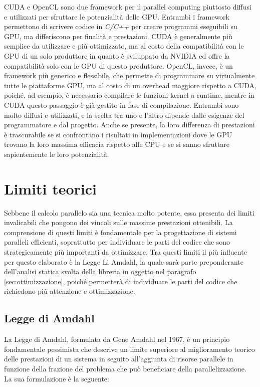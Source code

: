 CUDA e OpenCL sono due framework per il parallel computing piuttosto diffusi e utilizzati
per sfruttare le potenzialità delle GPU. Entrambi i framework permettono di
scrivere codice in \textit{C/C++} per creare programmi eseguibili su GPU, ma
differiscono per finalità e prestazioni. CUDA è generalmente più semplice da utilizzare
e più ottimizzato, ma al costo della compatibilità con le GPU di un solo
produttore in quanto è sviluppato da NVIDIA ed offre la compatibilità solo con
le GPU di questo produttore. OpenCL, invece, è un framework più generico e flessibile,
che permette di programmare su virtualmente tutte le piattaforme GPU, ma al costo
di un overhead maggiore rispetto a CUDA, poiché, ad esempio, è necessario
compilare le funzioni kernel a runtime, mentre in CUDA questo passaggio è già gestito
in fase di compilazione. Entrambi sono molto diffusi e utilizzati, e la scelta tra
uno e l'altro dipende dalle esigenze del programmatore e dal progetto. Anche se
presente, la loro differenza di prestazioni è trascurabile se si confrontano i risultati
in implementazioni dove le GPU trovano la loro massima efficacia rispetto alle CPU
e se si sanno sfruttare sapientemente le loro potenzialità.

\section{Limiti teorici}
\label{sec:limititeorici}

Sebbene il calcolo parallelo sia una tecnica molto potente, essa presenta dei limiti
invalicabili che pongono dei vincoli sulle massime prestazioni ottenibili. La
comprensione di questi limiti è fondamentale per la progettazione di sistemi
paralleli efficienti, soprattutto per individuare le parti del codice che sono strategicamente
più importanti da ottimizzare. Tra questi limiti il più influente per questo
elaborato è la Legge Li Amdahl, la quale sarà parte preponderante dell'analisi statica
svolta della libreria in oggetto nel paragrafo \ref{sec:ottimizzazione}, poiché
permetterà di individuare le parti del codice che richiedono più attenzione e
ottimizzazione.

\subsection{Legge di Amdahl}
\label{sec:amdahl}

La Legge di Amdahl, formulata da Gene Amdahl nel 1967, è un principio fondamentale
pessimista che descrive un limite superiore al miglioramento teorico delle prestazioni
di un sistema in seguito all'aggiunta di risorse parallele in funzione della frazione
del problema che può beneficiare della parallelizzazione. La sua formulazione è
la seguente:

